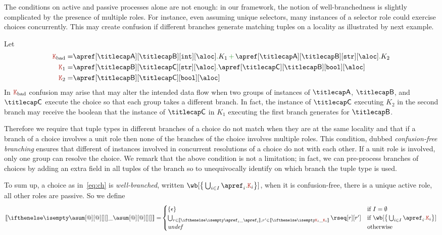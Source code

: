 The conditions on active and passive processes alone are not enough:
in our framework, the notion of well-branchedness is slightly
complicated by the presence of multiple roles.
%
For instance, even assuming unique selectors, many instances of a
selector role could exercise choices concurrently.
%
This may create confusion if different branches generate matching
tuples on a locality as illustrated by next example.
\begin{example}\label{ex:nonwb}
  Let
  \begin{align*}
    \aK_\mathrm{bad} = & \apref[\amulti A][\amulti B][{\asort[int]}][\aloc] \mkop{.} K_1 \chop \apref[\amulti A][\amulti B][{\asort[str]}][\aloc] \mkop{.} K_2
    \\
    \aK_1 = & \apref[\amulti B][\amulti C][{\asort[str]}][\aloc] \mkop{.} \apref[\amulti C][\amulti B][{\asort[bool]}][\aloc]
    \\
    \aK_2 = & \apref[\amulti B][\amulti C][{\asort[bool]}][\aloc]
  \end{align*}
  In $\aK_\mathrm{bad}$ confusion may arise that may alter the
  intended data flow when two groups of instances of $\amulti A$,
  $\amulti B$, and $\amulti C$ execute the choice so that each group
  takes a different branch.
  In fact, the instance of $\amulti C$ executing $K_2$ in the second
  branch may receive the boolean that the instance of $\amulti C$ in
  $K_1$ executing the first branch generates for $\amulti B$.
  \finex
\end{example}
%
Therefore we require that tuple types in different branches of a
choice do not match when they are at the same locality and that if a
branch of a choice involves a unit role then none of the branches of
the choice involves multiple roles.
%
This condition, dubbed \emph{confusion-free branching} ensures that
different  of instances involved in concurrent resolutions
of a choice do not  with each other. If a unit role is involved,
only one group can resolve the choice. 
%
We remark that the above condition is not a limitation; in fact, we
can pre-process branches of choices by adding an extra field in all
tuples of the branch so to unequivocally identify on which branch the
tuple type is used.

To sum up, a choice as in~\eqref{eq:ch} is \emph{well-branched},
written $\wb[{\big\{\bigcup_{i \in I}\apref_i\mkop{.}\aK_i\big\}}]$,
when it is confusion-free, there is a unique active role, all other
roles are passive.
%
So we define
%
\begin{align*}
  \ksem{\asum[@][@][][]} =
  &
    \begin{cases}
      \{ \emptypom \} & \text{if } I = \emptyset
      \\
      \bigcup_{\apom \in \ksem{\apref_i},\apom' \in \ksem{\aK_i}} \rseq[\apom][\apom']
      & 
      \text{if } \wb[{\big\{\bigcup_{i \in I}\apref_i\mkop{.}\aK_i\big\}}]
      \\
      \mathit{undef} & \text{otherwise}
    \end{cases}
  \\
\end{align*}

